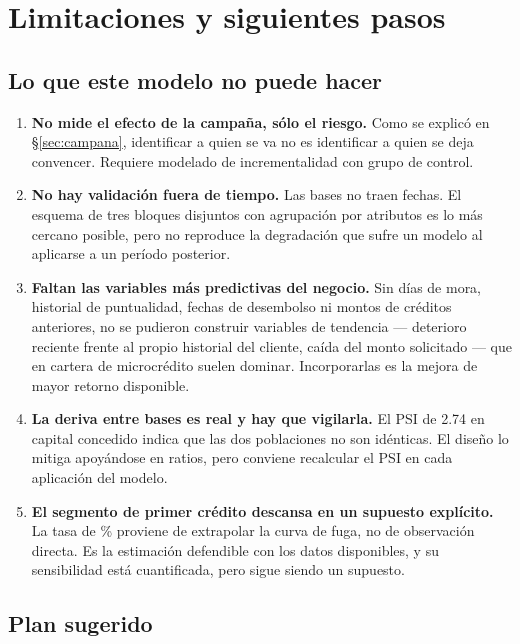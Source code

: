 \documentclass[11pt,a4paper]{article}
\begin{document}
\section{Limitaciones y siguientes pasos}

\subsection*{Lo que este modelo no puede hacer}

\begin{enumerate}[leftmargin=*]
\item \textbf{No mide el efecto de la campaña, sólo el riesgo.} Como se explicó en
      \S\ref{sec:campana}, identificar a quien se va no es identificar a quien se
      deja convencer. Requiere modelado de incrementalidad con grupo de control.
\item \textbf{No hay validación fuera de tiempo.} Las bases no traen fechas. El
      esquema de tres bloques disjuntos con agrupación por atributos es lo más
      cercano posible, pero no reproduce la degradación que sufre un modelo al
      aplicarse a un período posterior.
\item \textbf{Faltan las variables más predictivas del negocio.} Sin días de mora,
      historial de puntualidad, fechas de desembolso ni montos de créditos
      anteriores, no se pudieron construir variables de tendencia --- deterioro
      reciente frente al propio historial del cliente, caída del monto solicitado
      --- que en cartera de microcrédito suelen dominar. Incorporarlas es la
      mejora de mayor retorno disponible.
\item \textbf{La deriva entre bases es real y hay que vigilarla.} El PSI de 2.74
      en capital concedido indica que las dos poblaciones no son idénticas. El
      diseño lo mitiga apoyándose en ratios, pero conviene recalcular el PSI en
      cada aplicación del modelo.
\item \textbf{El segmento de primer crédito descansa en un supuesto explícito.}
      La tasa de \TasaKuno\% proviene de extrapolar la curva de fuga, no de
      observación directa. Es la estimación defendible con los datos disponibles,
      y su sensibilidad está cuantificada, pero sigue siendo un supuesto.
\end{enumerate}

\subsection*{Plan sugerido}
\end{document}
